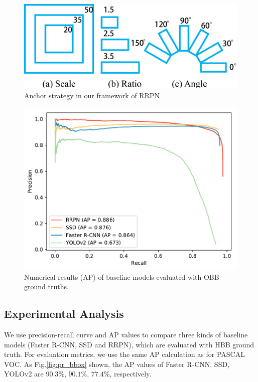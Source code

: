 \begin{figure}
	\includegraphics[width=\linewidth]{images/scale_ratio_angle.pdf}
	\caption{Anchor strategy in our framework of RRPN}
	\label{fig:anchors}
\end{figure}

\begin{figure}
	\includegraphics[width=\linewidth]{images/pr_rbbox.pdf}
	\caption{Numerical results (AP) of baseline models evaluated with OBB ground truths.}
	\label{fig:pr_rbbox}
\end{figure}



\subsection{Experimental Analysis}

We use precision-recall curve and AP values to compare  three kinds of baseline models (Faster R-CNN, SSD and RRPN), which are evaluated with HBB ground truth. For evaluation metrics, we use the same AP calculation as for PASCAL VOC. As Fig.\ref{fig:pr_bbox} shown, the AP values of Faster R-CNN, SSD, YOLOv2 are $ 90.3\% $, $ 90.1\% $, $ 77.4\% $, respectively.


